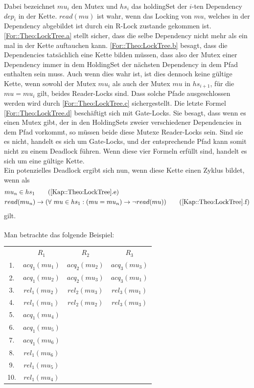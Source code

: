 Dabei bezeichnet $mu_i$ den Mutex und $hs_i$ das holdingSet der $i$-ten 
Dependency $dep_i$ in der Kette. $read(mu)$ ist wahr, wenn das Locking von $mu$, welches 
in der Dependency abgebildet ist durch ein R-Lock zustande gekommen ist.\\
\eqref{For::Theo:LockTree.a} stellt sicher, dass die selbe 
Dependency nicht mehr als ein mal in der Kette auftauchen kann.  
\eqref{For::Theo:LockTree.b} besagt, dass die Dependencies tatsächlich
eine Kette bilden müssen, dass also der Mutex einer Dependency immer in dem 
HoldingSet der nächsten Dependency in dem Pfad enthalten sein muss. 
Auch wenn dies wahr ist, ist dies dennoch keine gültige Kette, wenn sowohl der
Mutex $mu_i$ als auch der Mutex $mu$ in $hs_{i+1}$, für die $mu = mu_i$ gilt, 
beides Reader-Locks sind. Dass solche Pfade ausgeschlossen werden wird durch 
\eqref{For::Theo:LockTree.c} sichergestellt. Die letzte Formel 
\eqref{For::Theo:LockTree.d} beschäftigt sich mit Gate-Locks. 
Sie besagt, dass wenn es einen Mutex gibt, 
der in den HoldingSets zweier verschiedener Dependencies in dem Pfad vorkommt, 
so müssen beide diese Mutexe Reader-Locks sein. Sind sie es nicht, handelt es 
sich um Gate-Locks, und der entsprechende Pfad kann somit nicht zu einem 
Deadlock führen. Wenn diese vier Formeln erfüllt sind, handelt es sich um eine 
gültige Kette.\\
Ein potenzielles Deadlock ergibt sich nun, wenn diese Kette einen Zyklus 
bildet, wenn als 
\begin{align}
  &mu_n \in hs_{1} 
  \tag{\ref{Kap::Theo:LockTree}.e}
  \label{For::Implementation:Periodical.e}\\
  &read(mu_n) \rightarrow 
  (\forall\ mu \in hs_{1}: (mu = mu_n) \to \lnot read(mu))
  \tag{\ref{Kap::Theo:LockTree}.f}
  \label{For::Implementation:Periodical.f}
\end{align}
gilt.\\\\
Man betrachte das folgende Beispiel:
\begin{table}[H]
    \centering
    \begin{tabular}{cccc}
        & $R_1$           & $R_2$           & $R_3$\\
        1. & $acq_{1}(mu_1)$ & $acq_{2}(mu_2)$ & $acq_{3}(mu_3)$ \\
        2. & $acq_{1}(mu_2)$ & $acq_{2}(mu_3)$ & $acq_{3}(mu_1)$ \\
        3. & $rel_{1}(mu_2)$ & $rel_{2}(mu_3)$ & $rel_{3}(mu_1)$\\
        4. & $rel_{1}(mu_1)$ & $rel_{2}(mu_2)$ & $rel_{3}(mu_3)$\\
        5. & $acq_{1}(mu_4)$ &                 & \\
        6. & $acq_{1}(mu_5)$ &                 & \\
        7. & $acq_{1}(mu_6)$ &                 & \\
        8. & $rel_{1}(mu_6)$ &                 & \\
        9. & $rel_{1}(mu_5)$ &                 & \\
        10. & $rel_{1}(mu_4)$ &                 & \\
   \end{tabular}
\end{table}
